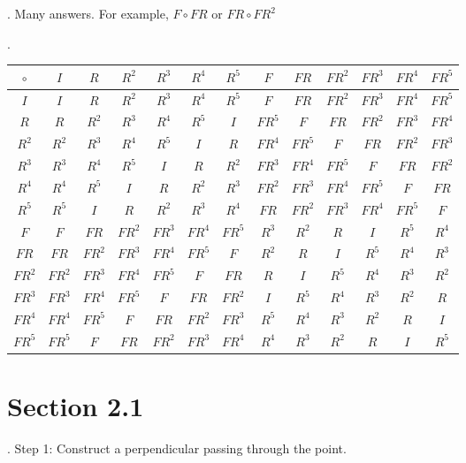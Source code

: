 .  Many answers.  For example, $F \circ FR$ or $FR \circ FR^2$

.  \vskip 0.1in
\tiny
\noindent \begin{tabular}{|c||c|c|c|c|c|c|c|c|c|c|c|c|}
		\hline
		$\circ$ & $I$ & $R$ & $R^2$ & $R^3$ & $R^4$ & $R^5$ & $F$ & $FR$ & $FR^2$ & $FR^3$ & $FR^4$ & $FR^5$ \\ \hline \hline 
		$I$ & $I$ & $R$ & $R^2$ & $R^3$ & $R^4$ & $R^5$ & $F$ & $FR$ & $FR^2$ & $FR^3$ & $FR^4$ & $FR^5$ \\ \hline
		$R$ & $R$ & $R^2$ & $R^3$ & $R^4$ & $R^5$ & $I$ & $FR^5$ & $F$ & $FR$ & $FR^2$ & $FR^3$ & $FR^4$\\ \hline
		$R^2$ & $R^2$ & $R^3$ & $R^4$ & $R^5$ & $I$ & $R$ & $FR^4$ &  $FR^5$ & $F$ & $FR$ & $FR^2$ & $FR^3$ \\ \hline
		$R^3$ &  $R^3$ & $R^4$ & $R^5$ & $I$ & $R$ & $R^2$ & $FR^3$ & $FR^4$ &  $FR^5$ & $F$ & $FR$ & $FR^2$ \\ \hline
		$R^4$ &  $R^4$ & $R^5$ & $I$ & $R$ & $R^2$ & $R^3$ & $FR^2$ & $FR^3$ & $FR^4$ &  $FR^5$ & $F$ & $FR$ \\ \hline
		$R^5$ & $R^5$ & $I$ & $R$ & $R^2$ & $R^3$ & $R^4$ & $FR$ & $FR^2$ & $FR^3$ & $FR^4$ &  $FR^5$ & $F$  \\ \hline
		$F$ & $F$ & $FR$ & $FR^2$ & $FR^3$ & $FR^4$ & $FR^5$ & $R^3$ & $R^2$ & $R$ & $I$ & $R^5$ & $R^4$ \\ \hline
		$FR$ & $FR$ & $FR^2$ & $FR^3$ & $FR^4$ & $FR^5$ & $F$ & $R^2$ & $R$ & $I$ & $R^5$ & $R^4$ & $R^3$ \\ \hline
		$FR^2$ & $FR^2$ & $FR^3$ & $FR^4$ & $FR^5$ & $F$ & $FR$ & $R$ & $I$ & $R^5$ & $R^4$ & $R^3$ & $R^2$  \\ \hline
		$FR^3$ & $FR^3$ & $FR^4$ & $FR^5$ & $F$ & $FR$ & $FR^2$ & $I$ & $R^5$ & $R^4$ & $R^3$ & $R^2$ & $R$  \\ \hline
		$FR^4$ & $FR^4$ & $FR^5$ & $F$ & $FR$ & $FR^2$ & $FR^3$ & $R^5$ & $R^4$ & $R^3$ & $R^2$ & $R$ & $I$ \\ \hline
		$FR^5$ & $FR^5$ & $F$ & $FR$ & $FR^2$ & $FR^3$ & $FR^4$ &  $R^4$ & $R^3$ & $R^2$ & $R$ & $I$ & $R^5$\\ \hline
		\hline
	\end{tabular}
\normalsize

\section*{Section 2.1}


 .  Step 1: Construct a perpendicular passing through the point. 
 

